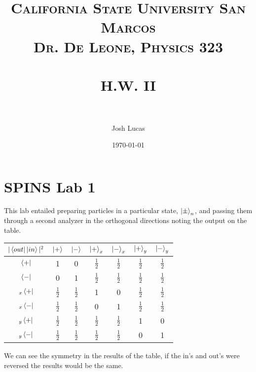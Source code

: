 \documentclass[paper=a4, fontsize=11pt]{scrartcl} %
\title{	
\normalfont \normalsize 
\textsc{California State University San Marcos \\ Dr. De Leone, Physics 323} \\ [25pt] %
\horrule{0.5pt} \\[0.4cm] %
\huge H.W. II \\ %
\horrule{2pt} \\[0.5cm] %
}
\author{Josh Lucas} %
\date{\normalsize\today} %
\numberwithin{equation}{section} %
\numberwithin{figure}{section} %
\numberwithin{table}{section} %
\begin{document}
\maketitle %


\section{SPINS Lab 1}
This lab entailed preparing particles in a particular state, $\ket{\pm}_n$, and passing them through a second analyzer in the orthogonal directions noting the output on the table.
\renewcommand{\arraystretch}{2}
\begin{center}
  \begin{tabular}{ | c | c | c | c | c | c | c | }
    \hline
    $|\bra{out}\ket{in}|^2$ & $\ket{+}$& $\ket{-}$ & $\ket{+}_x$ & $\ket{-}_x$ & $\ket{+}_y$ & $\ket{-}_y$ \\ \hline
  $  \bra{+}$ & 1 &0   & $\tfrac{1}{2}$ & $\tfrac{1}{2}$  & $\tfrac{1}{2}$ & $\tfrac{1}{2}$   \\ \hline
    $\bra{-}$ & 0 & 1 & $\tfrac{1}{2}$ &$\tfrac{1}{2}$  & $\tfrac{1}{2}$ &  $\tfrac{1}{2}$ \\
    \hline
       $_x\bra{+}$ & $\tfrac{1}{2}$ & $\tfrac{1}{2}$ & 1 & 0 & $\tfrac{1}{2}$ & $\tfrac{1}{2}$  \\
    \hline
       $_x\bra{-}$ & $\tfrac{1}{2}$ & $\tfrac{1}{2}$ & 0 & 1 &$\tfrac{1}{2}$  & $\tfrac{1}{2}$  \\
    \hline
       $_y\bra{+}$ & $\tfrac{1}{2}$ &$\tfrac{1}{2}$  &$\tfrac{1}{2}$  &$\tfrac{1}{2}$  & 1 &  0 \\
    \hline
       $_y\bra{-}$ &$\tfrac{1}{2}$  &$\tfrac{1}{2}$  & $\tfrac{1}{2}$ & $\tfrac{1}{2}$ & 0 & 1  \\
    \hline
  \end{tabular}
\end{center}
We can see the symmetry in the results of the table, if the in's and out's were reversed the results would be the same.
\end{document}
